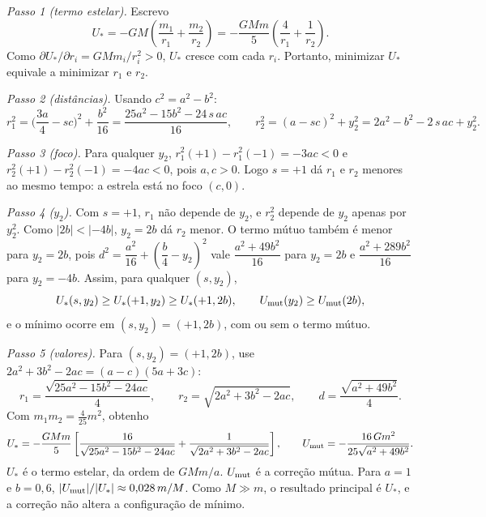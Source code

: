 \documentclass{article}%
\begin{document}
\textit{Passo 1 (termo estelar).} Escrevo
\[ U_*=-GM\left(\frac{m_1}{r_1}+\frac{m_2}{r_2}\right)=-\frac{GMm}{5}\left(\frac{4}{r_1}+\frac{1}{r_2}\right). \]
Como $\partial U_*/\partial r_i=GMm_i/r_i^2>0$, $U_*$ cresce com cada $r_i$. Portanto, minimizar $U_*$ equivale a minimizar $r_1$ e $r_2$.

\textit{Passo 2 (distâncias).} Usando $c^2=a^2-b^2$:
\[ r_1^2=\Big(\frac{3a}{4}-sc\Big)^2+\frac{b^2}{16}=\frac{25a^2-15b^2-24\,s\,ac}{16}, \qquad r_2^2=(a-sc)^2+y_2^2=2a^2-b^2-2\,s\,ac+y_2^2. \]

\textit{Passo 3 (foco).} Para qualquer $y_2$, $r_1^2(+1)-r_1^2(-1)=-3ac<0$ e $r_2^2(+1)-r_2^2(-1)=-4ac<0$, pois $a,c>0$. Logo $s=+1$ dá $r_1$ e $r_2$ menores ao mesmo tempo: a estrela está no foco $(c,0)$.

\textit{Passo 4 ($y_2$).} Com $s=+1$, $r_1$ não depende de $y_2$, e $r_2^2$ depende de $y_2$ apenas por $y_2^2$. Como $|2b|<|-4b|$, $y_2=2b$ dá $r_2$ menor. O termo mútuo também é menor para $y_2=2b$, pois $d^2=\dfrac{a^2}{16}+\left(\dfrac b4-y_2\right)^2$ vale $\dfrac{a^2+49b^2}{16}$ para $y_2=2b$ e $\dfrac{a^2+289b^2}{16}$ para $y_2=-4b$. Assim, para qualquer $(s,y_2)$,
\[ U_*(s,y_2)\ge U_*(+1,y_2)\ge U_*(+1,2b), \qquad U_{\rm mut}(y_2)\ge U_{\rm mut}(2b), \]
e o mínimo ocorre em $(s,y_2)=(+1,2b)$, com ou sem o termo mútuo.

\textit{Passo 5 (valores).} Para $(s,y_2)=(+1,2b)$, use $2a^2+3b^2-2ac=(a-c)(5a+3c)$:
\[ r_1=\frac{\sqrt{25a^2-15b^2-24ac}}{4},\qquad r_2=\sqrt{2a^2+3b^2-2ac},\qquad d=\frac{\sqrt{a^2+49b^2}}{4}. \]
Com $m_1m_2=\frac{4}{25}m^2$, obtenho
\[ U_*=-\frac{GMm}{5}\left[\frac{16}{\sqrt{25a^2-15b^2-24ac}}+\frac{1}{\sqrt{2a^2+3b^2-2ac}}\right], \qquad U_{\rm mut}=-\frac{16\,Gm^2}{25\sqrt{a^2+49b^2}}. \]
$U_*$ é o termo estelar, da ordem de $GMm/a$. $U_{\rm mut}$ é a correção mútua. Para $a=1$ e $b=0{,}6$, $|U_{\rm mut}|/|U_*|\approx 0{,}028\,m/M$. Como $M\gg m$, o resultado principal é $U_*$, e a correção não altera a configuração de mínimo.
\end{document}

